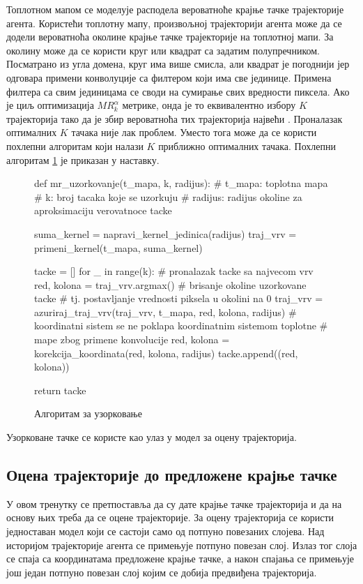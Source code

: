 \documentclass[11pt,oneside]{memoir}
\begin{document}
Топлотном мапом се моделује расподела вероватноће крајње тачке трајекторије агента. Користећи топлотну мапу, 
произвољној трајекторији агента може да се додели вероватноћа околине крајње тачке трајекторије на топлотној мапи. За околину може да се користи круг или квадрат са задатим 
полупречником. Посматрано из угла домена, круг има више смисла, али квадрат је погоднији јер одговара примени конволуције са филтером који има све јединице.
Примена филтера са свим јединицама се своди на сумирање свих вредности пиксела.
Ако је циљ оптимизација $MR^{\alpha}_{k}$ метрике, онда је то еквивалентно избору $K$ трајекторија тако да је збир вероватноћа 
тих трајекторија највећи \cite{home}. 
Проналазак оптималних $K$ тачака није лак проблем. Уместо тога може да се користи похлепни алгоритам који налази $K$ приближно оптималних
тачака. Похлепни алгоритам \ref{home-sampling-mr} је приказан у наставку.

\begin{figure}[H]
  \begin{python}
  def mr_uzorkovanje(t_mapa, k, radijus):
    # t_mapa: toplotna mapa
    # k: broj tacaka koje se uzorkuju
    # radijus: radijus okoline za aproksimaciju verovatnoce tacke

    suma_kernel = napravi_kernel_jedinica(radijus)
    traj_vrv = primeni_kernel(t_mapa, suma_kernel)
    
    tacke = []
    for _ in range(k):
      # pronalazak tacke sa najvecom vrv
      red, kolona = traj_vrv.argmax()  
      # brisanje okoline uzorkovane tacke
      # tj. postavljanje vrednosti piksela u okolini na 0
      traj_vrv = azuriraj_traj_vrv(traj_vrv, t_mapa, red, kolona, radijus)
      # koordinatni sistem se ne poklapa koordinatnim sistemom toplotne 
      # mape zbog primene konvolucije
      red, kolona = korekcija_koordinata(red, kolona, radijus)
      tacke.append((red, kolona))

    return tacke
  \end{python}
  \caption{Алгоритам за узорковање\label{home-sampling-mr}}
\end{figure}

Узорковане тачке се користе као улаз у модел за оцену трајекторија.
  
\subsection{Оцена трајекторије до предложене крајње тачке}

У овом тренутку се претпоставља да су дате крајње тачке трајекторија и да на основу њих треба да се оцене трајекторије. За оцену
трајекторија се користи једноставан модел који се састоји само од потпуно повезаних слојева. Над историјом трајекторије агента се
примењује потпуно повезан слој. Излаз тог слоја се спаја са координатама предложене крајње тачке, а након спајања се примењује још један
потпуно повезан слој којим се добија предвиђена трајекторија.
\end{document}
